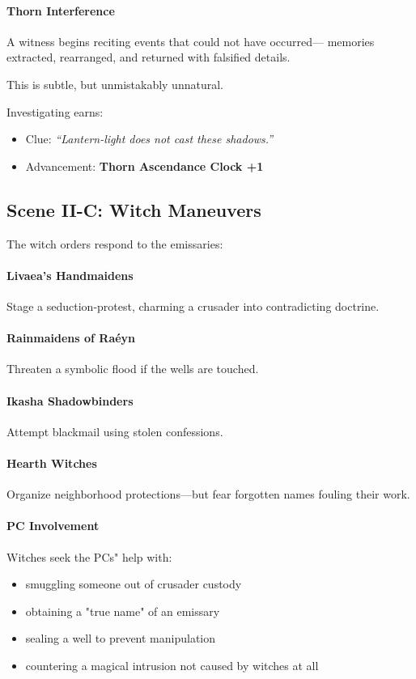 \documentclass[11pt]{book}
\begin{document}
\paragraph{Thorn Interference}
A witness begins reciting events that could not have occurred---  
memories extracted, rearranged, and returned with falsified details.

This is subtle, but unmistakably unnatural.

Investigating earns:
\begin{itemize}
    \item Clue: \emph{``Lantern-light does not cast these shadows.''}
    \item Advancement: \textbf{Thorn Ascendance Clock +1}
\end{itemize}

\subsection*{Scene II-C: Witch Maneuvers}

The witch orders respond to the emissaries:

\paragraph{Livaea's Handmaidens}
Stage a seduction-protest, charming a crusader into contradicting doctrine.

\paragraph{Rainmaidens of Raéyn}
Threaten a symbolic flood if the wells are touched.

\paragraph{Ikasha Shadowbinders}
Attempt blackmail using stolen confessions.

\paragraph{Hearth Witches}
Organize neighborhood protections---but fear forgotten names fouling their work.

\paragraph{PC Involvement}
Witches seek the PCs" help with:
\begin{itemize}[leftmargin=*]
    \item smuggling someone out of crusader custody  
    \item obtaining a "true name" of an emissary  
    \item sealing a well to prevent manipulation  
    \item countering a magical intrusion not caused by witches at all  
\end{itemize}
\end{document}

